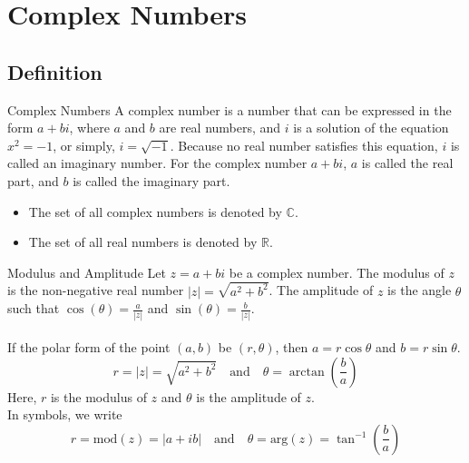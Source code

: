 
\section{Complex Numbers}
\subsection{Definition}

\begin{definition}{Complex Numbers}{}
    A complex number is a number that can be expressed in the form $a + bi$, where $a$ and $b$ are real numbers, and $i$ is a solution of the equation $x^2 = -1$, or simply, $i=\sqrt{-1}$. Because no real number satisfies this equation, $i$ is called an imaginary number. For the complex number $a + bi$, $a$ is called the real part, and $b$ is called the imaginary part. 
    \begin{itemize}
        \item The set of all complex numbers is denoted by $\mathbb{C}$.
        \item The set of all real numbers is denoted by $\mathbb{R}$.
    \end{itemize}
\end{definition}

\begin{definition}{Modulus and Amplitude}{}
    Let $z = a + bi$ be a complex number. The modulus of $z$ is the non-negative real number $|z| = \sqrt{a^2 + b^2}$. The amplitude of $z$ is the angle $\theta$ such that $\cos(\theta) = \frac{a}{|z|}$ and $\sin(\theta) = \frac{b}{|z|}$. \\~\\
    If the polar form of the point $(a,b)$ be $(r,\theta)$, then $a = r\cos\theta$ and $b = r\sin\theta$.
    \begin{equation}
        r = |z| = \sqrt{a^2 + b^2} \quad \text{and} \quad \theta = \arctan\left(\frac{b}{a}\right)
    \end{equation}
    Here, $r$ is the modulus of $z$ and $\theta$ is the amplitude of $z$. \\
    In symbols, we write
    \begin{equation}
        r = \text{mod} (z) = |a+ib| \quad \text{and} \quad \theta = \text{arg} (z) = \tan^{-1}\left(\frac{b}{a}\right)
    \end{equation}
\end{definition}

